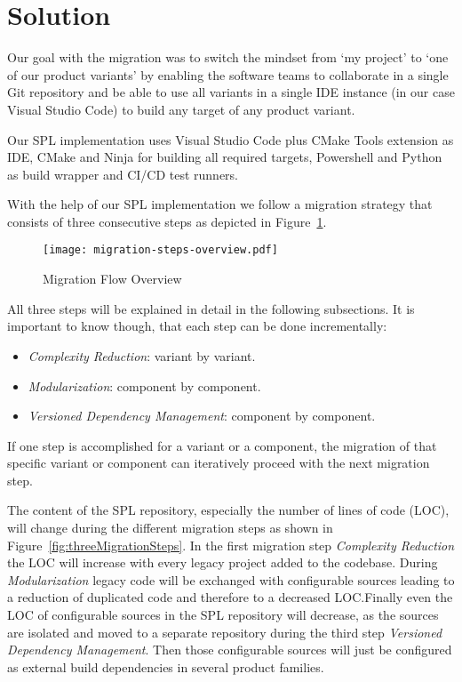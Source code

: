 \section{Solution}\label{solution}

Our goal with the migration was to switch the mindset from `my project' to `one
of our product variants' by enabling the software teams to collaborate in a
single Git repository and be able to use all variants in a single IDE instance
(in our case Visual Studio Code) to build any target of any product variant.

Our SPL implementation uses Visual Studio Code plus CMake Tools extension as
IDE, CMake and Ninja for building all required targets, Powershell and Python as
build wrapper and CI/CD test runners.

With the help of our SPL implementation we follow a migration strategy that
consists of three consecutive steps as depicted in Figure~\ref{fig:migrationFlow}.

\begin{figure}[htb]
  \centering
  \texttt{[image: migration-steps-overview.pdf]}
  \caption{Migration Flow Overview}
  \label{fig:migrationFlow}
\end{figure}

All three steps will be explained in detail in the following subsections.
It is important to know though, that each step can be done incrementally:
\begin{itemize}
  \item \textit{Complexity Reduction}: variant by variant.
  \item \textit{Modularization}: component by component.
  \item \textit{Versioned Dependency Management}: component by component.
\end{itemize}

If one step is accomplished for a variant or a component, the migration of that
specific variant or component can iteratively proceed with the next migration
step.

The content of the SPL repository, especially the number of lines of code (LOC),
will change during the different migration steps as shown in
Figure~\ref{fig:threeMigrationSteps}. In the first migration step
\textit{Complexity Reduction} the LOC will increase with every legacy project
added to the codebase. During \textit{Modularization} legacy code will be
exchanged with configurable sources leading to a reduction of duplicated code
and therefore to a decreased LOC.\@ Finally even the LOC of configurable sources
in the SPL repository will decrease, as the sources are isolated and moved to a
separate repository during the third step \textit{Versioned Dependency
Management}. Then those configurable sources will just be configured as external
build dependencies in several product families.

